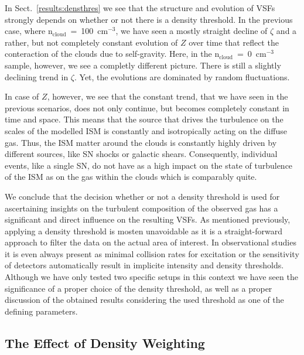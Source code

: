 In Sect.~\ref{results:densthres} we see that the structure and evolution of VSFs strongly depends on whether or not there is a density threshold. 
In the previous case, where n$_\mathrm{cloud}$~=~100~cm$^{-3}$, we have seen a mostly straight decline of $\zeta$ and a rather, but not completely constant evolution of $Z$ over time that reflect the conteraction of the clouds due to self-gravity.
Here, in the n$_\mathrm{cloud}$~=~0~cm$^{-3}$ sample, however, we see a completly different picture.
There is still a slightly declining trend in $\zeta$.
Yet, the evolutions are dominated by random fluctuations.

In case of $Z$, however, we see that the constant trend, that we have seen in the previous scenarios, does not only continue, but becomes completely constant in time and space. 
This means that the source that drives the turbulence on the scales of the modelled ISM is constantly and isotropically acting on the diffuse gas.
Thus, the ISM matter around the clouds is constantly highly driven by different sources, like SN shocks or galactic shears.
Consequently, individual events, like a single SN, do not have as a high impact on the state of turbulence of the ISM as on the gas within the clouds which is comparably quite.


We conclude that the decision whether or not a density threshold is used for ascertaining insights on the turbulent composition of the observed gas has a significant and direct influence on the resulting VSFs.
As mentioned previously, applying a density threshold is mosten unavoidable as it is a straight-forward approach to filter the data on the actual area of interest.
In observational studies it is even always present as minimal collision rates for excitation or the sensitivity of detectors automatically result in implicite intensity and density thresholds. 
Although we have only tested two specific setups in this context we have seen the significance of a proper choice of the density threshold, as well as a proper discussion of the obtained results considering the used threshold as one of the defining parameters.


\subsection{The Effect of Density Weighting}\label{discussion:densweight}

